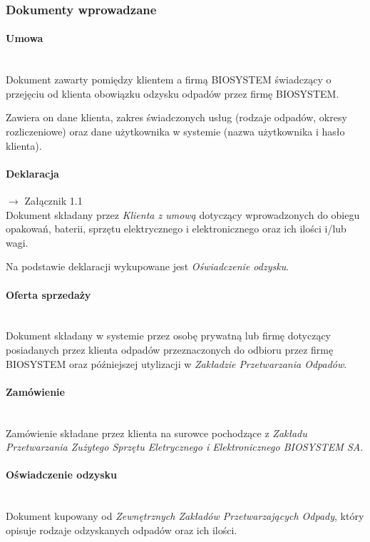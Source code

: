 
\subsubsection{Dokumenty wprowadzane}

	\paragraph{Umowa} \ \\
	Dokument zawarty pomiędzy klientem a firmą BIOSYSTEM świadczący o przejęciu od klienta obowiązku odzysku odpadów przez firmę BIOSYSTEM.

	Zawiera on dane klienta, zakres świadczonych usług (rodzaje odpadów, okresy rozliczeniowe) oraz dane użytkownika w systemie (nazwa użytkownika i hasło klienta).

	\paragraph{Deklaracja} $\rightarrow$ Załącznik 1.1 \\
	Dokument składany przez \emph{Klienta z umową} dotyczący wprowadzonych do obiegu opakowań, baterii, sprzętu elektrycznego i elektronicznego oraz ich ilości i/lub wagi.

	Na podstawie deklaracji wykupowane jest \emph{Oświadczenie odzysku}.

	\paragraph{Oferta sprzedaży} \ \\
	Dokument składany w systemie przez osobę prywatną lub firmę dotyczący posiadanych przez klienta odpadów przeznaczonych do odbioru przez firmę BIOSYSTEM oraz późniejszej utylizacji w \emph{Zakładzie Przetwarzania Odpadów}.

	\paragraph{Zamówienie} \ \\
	Zamówienie składane przez klienta na surowce pochodzące z \emph{Zakładu Przetwarzania Zużytego Sprzętu Eletrycznego i Elektronicznego BIOSYSTEM SA}.

	\paragraph{Oświadczenie odzysku} \ \\
	Dokument kupowany od \emph{Zewnętrznych Zakładów Przetwarzających Odpady}, który opisuje rodzaje odzyskanych odpadów oraz ich ilości.

